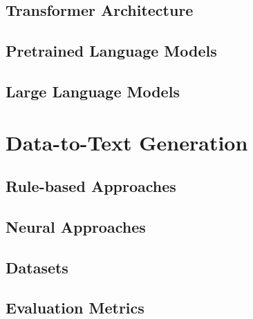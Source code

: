 \subsection{Transformer Architecture}
\label{sec:transformer}
\subsection{Pretrained Language Models}
\label{sec:plms}
\subsection{Large Language Models}
\label{sec:llms}
\section{Data-to-Text Generation}
\label{sec:d2t}
\subsection{Rule-based Approaches}
\label{sec:rule-d2t}
\subsection{Neural Approaches}
\label{sec:neural-d2t}
\subsection{Datasets}
\label{sec:datasets}
\subsection{Evaluation Metrics}
\label{sec:evaluation}
